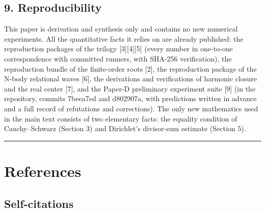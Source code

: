 \documentclass[
  a4paper,
]{article}
\begin{document}
\subsection{9. Reproducibility}\label{reproducibility}

This paper is derivation and synthesis only and contains no new
numerical experiments. All the quantitative facts it relies on are
already published: the reproduction packages of the trilogy
{[}3{]}{[}4{]}{[}5{]} (every number in one-to-one correspondence with
committed runners, with SHA-256 verification), the reproduction bundle
of the finite-order roots {[}2{]}, the reproduction package of the
N-body relational waves {[}6{]}, the derivations and verifications of
harmonic closure and the real center {[}7{]}, and the Paper-D
preliminary experiment suite {[}9{]} (in the repository, commits
7beea7ed and d802907a, with predictions written in advance and a full
record of refutations and corrections). The only new mathematics used in
the main text consists of two elementary facts: the equality condition
of Cauchy--Schwarz (Section 3) and Dirichlet's divisor-sum estimate
(Section 5).

\begin{center}\rule{0.5\linewidth}{0.5pt}\end{center}

\section{References}\label{references}

\subsection{Self-citations}\label{self-citations}
\end{document}

